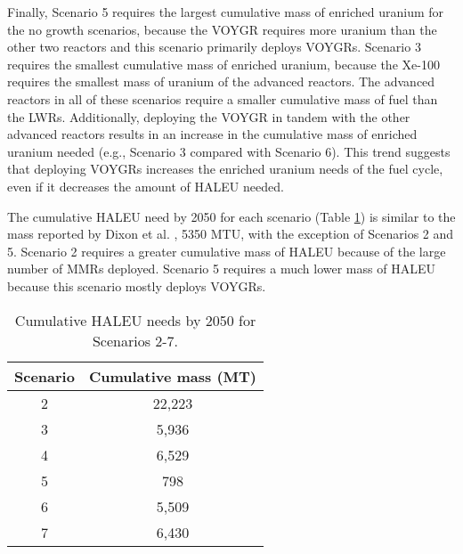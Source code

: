 Finally, Scenario 5 requires the largest cumulative mass of enriched uranium 
for the no growth scenarios, because the VOYGR requires more uranium than 
the other two reactors and this scenario primarily deploys VOYGRs. Scenario 3 
requires the smallest cumulative 
mass of enriched uranium, because the Xe-100 requires the smallest mass of 
uranium of the advanced reactors. The advanced reactors 
in all of these scenarios require a smaller cumulative mass of fuel than 
the \glspl{LWR}. Additionally, deploying the VOYGR in tandem with the other 
advanced reactors results in an increase in the cumulative mass 
of enriched uranium needed (e.g., Scenario 3 compared with Scenario 6). This
trend suggests that deploying VOYGRs increases the enriched uranium needs 
of the fuel cycle, even if it decreases the amount of \gls{HALEU} needed. 

The cumulative \gls{HALEU} need by 2050 for each scenario (Table 
\ref{tab:nogrowth_haleu}) is similar to the mass reported by 
Dixon et al. \cite{dixon_estimated_2022}, 5350 MTU, with the exception 
of Scenarios 2 and 5. Scenario 2 requires a greater cumulative mass of 
\gls{HALEU} because of the large number of \glspl{MMR} deployed. Scenario 
5 requires a much lower mass of \gls{HALEU} because this scenario mostly 
deploys VOYGRs. 

\begin{table}[h!]
    \centering 
    \caption{Cumulative HALEU needs by 2050 for Scenarios 2-7.}
    \label{tab:nogrowth_haleu}
    \begin{tabular}{c c}
        \hline 
        Scenario & Cumulative mass (MT) \\
        \hline
        2 & 22,223\\
        3 & 5,936 \\
        4 & 6,529 \\
        5 & 798 \\
        6 & 5,509 \\
        7 & 6,430 \\
        \hline        
    \end{tabular}
\end{table}

